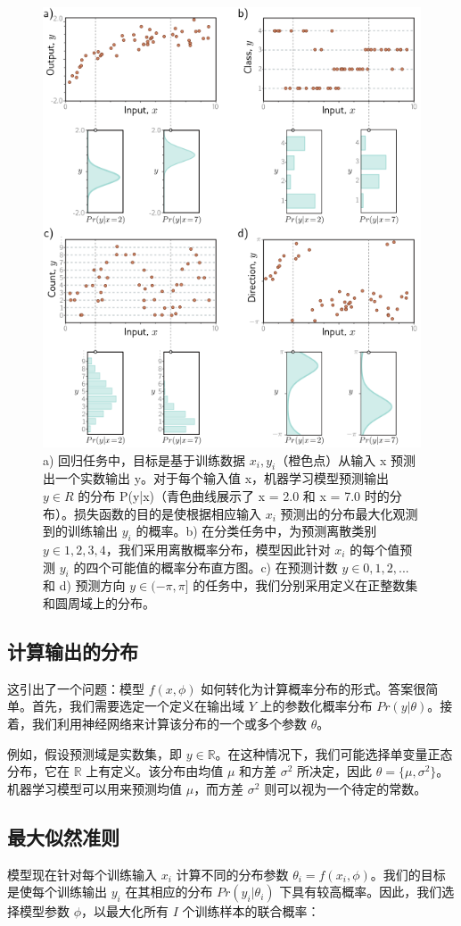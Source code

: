 \begin{figure}[ht!]
	\centering
	\includegraphics[width=0.7\linewidth]{png/chapter5/LossDataTypes.png}
	\caption{a) 回归任务中，目标是基于训练数据 \({x_i,y_i}\)（橙色点）从输入 x 预测出一个实数输出 y。对于每个输入值 x，机器学习模型预测输出 \(y \in R\) 的分布 P(y|x)（青色曲线展示了 x = 2.0 和 x = 7.0 时的分布）。损失函数的目的是使根据相应输入 \(x_i\) 预测出的分布最大化观测到的训练输出 \(y_i\) 的概率。b) 在分类任务中，为预测离散类别 \(y \in {1, 2, 3, 4}\)，我们采用离散概率分布，模型因此针对 \(x_i\) 的每个值预测 \(y_i\) 的四个可能值的概率分布直方图。c) 在预测计数 \(y \in {0, 1, 2, ...}\) 和 d) 预测方向 \(y \in (−\pi, \pi]\) 的任务中，我们分别采用定义在正整数集和圆周域上的分布。}
\end{figure}


\subsection{计算输出的分布}
这引出了一个问题：模型 \(f(x, \phi)\) 如何转化为计算概率分布的形式。答案很简单。首先，我们需要选定一个定义在输出域 \(Y\) 上的参数化概率分布 \(Pr(y|\theta)\)。接着，我们利用神经网络来计算该分布的一个或多个参数 \(\theta\)。

例如，假设预测域是实数集，即 \(y \in \mathbb{R}\)。在这种情况下，我们可能选择单变量正态分布，它在 \(\mathbb{R}\) 上有定义。该分布由均值 \(\mu\) 和方差 \(\sigma^2\) 所决定，因此 \(\theta = \{\mu, \sigma^2\}\)。机器学习模型可以用来预测均值 \(\mu\)，而方差 \(\sigma^2\) 则可以视为一个待定的常数。
\subsection{最大似然准则}
模型现在针对每个训练输入 \(x_i\) 计算不同的分布参数 \(\theta_i = f(x_i, \phi)\)。我们的目标是使每个训练输出 \(y_i\) 在其相应的分布 \(Pr(y_i|\theta_i)\) 下具有较高概率。因此，我们选择模型参数 \(\phi\)，以最大化所有 \(I\) 个训练样本的联合概率：

